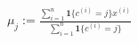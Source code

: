 \documentclass[preview]{standalone}
\begin{document}
\begin{align*}
\mu_{j}:=\frac{\sum_{i=1}^{n}\mathbf{1}\{c^{(i)}=j\}x^{(i)}}{\sum_{i=1}^{n}\mathbf{1}\{c^{(i)}=j\}}
\end{align*}
\end{document}
